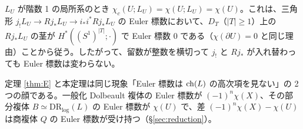 \begin{cor}[壁越えの恒等式]\tP\label{cor:wall}
$L_U$ が階数 1 の局所系のとき $\chi_c(U;L_U)=\chi(U;L_U)=\chi(U)$。これは、三角形 $j_!L_U\to Rj_*L_U\to i_*i^*Rj_*L_U$ の Euler 標数において、$D_T$（$|T|\ge1$）上の $Rj_*L_U$ の茎が $H^*((S^1)^{|T|};\cdot)$ で Euler 標数 0 である（$\chi(\partial U)=0$ と同じ理由）ことから従う。したがって、留数が整数を横切って $j_!$ と $Rj_*$ が入れ替わっても Euler 標数は変わらない。
\end{cor}
\begin{rem}\tP
定理 \ref{thm:E} と本定理は同じ現象「Euler 標数は $\mathrm{ch}(L)$ の高次項を見ない」の 2 つの顔である。一般化 Dolbeault 複体の Euler 標数が $(-1)^n\chi(X)$、その部分複体 $B\simeq\mathrm{DR}_{\log}(L)$ の Euler 標数が $\chi(U)$ で、差 $(-1)^n\chi(X)-\chi(U)$ は商複体 $Q$ の Euler 標数が受け持つ（\S\ref{sec:reduction}）。
\end{rem}
